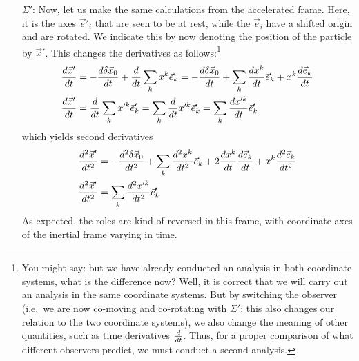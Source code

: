 \documentclass[../class_mech_main.tex]{subfiles}
\begin{document}
\begin{itemize}
	\item[$\Sigma'$:] Now, let us make the same calculations from the accelerated frame. Here, it is the axes $\vec{e}'_i$ that are seen to be at rest, while the $\vec{e}_i$ have a shifted origin and are rotated. We indicate this by now denoting the position of the particle by $\vec{x}'$. This changes the derivatives as follows:\footnote{You might say: but we have already conducted an analysis in both coordinate systems, what is the difference now? Well, it is correct that we will carry out an analysis in the same coordinate systems. But by switching the observer (i.e.~we are now co-moving and co-rotating with $\Sigma'$; this also changes our relation to the two coordinate systems), we also change the meaning of other quantities, such as time derivatives $\dv{t}$. Thus, for a proper comparison of what different observers predict, we must conduct a second analysis.}
	\begin{align}
		\dv{\vec{x}'}{t} &= -\dv{\delta \vec{x}_0}{t} + \dv{t} \sum_k x^k\vec{e}_k = -\dv{\delta \vec{x}_0}{t} + \sum_k \dv{x^k}{t} \vec{e}_k + x^k \dv{\vec{e}_k}{t}
		\label{eq:velocity_from_accel_frame_in_inert_frame}
		\\
		\dv{\vec{x}'}{t} &= \dv{t} \sum_k x'^k \vec{e}'_k = \sum_k \dv{t} x'^k \vec{e}'_k = \sum_k \dv{x'^k}{t} \vec{e}'_k
		\label{eq:velocity_from_accel_frame_in_accel_frame}
	\end{align}
	which yields second derivatives
	\begin{align}
		\dv[2]{\vec{x}'}{t} &= -\dv[2]{\delta \vec{x}_0}{t} + \sum_k \dv[2]{x^k}{t} \vec{e}_k + 2 \dv{x^k}{t} \dv{\vec{e}_k}{t} + x^k \dv[2]{\vec{e}_k}{t}
		\label{eq:acceleration_from_accel_frame_in_inert_frame}
		\\
		\dv[2]{\vec{x}'}{t} &= \sum_k \dv[2]{x'^k}{t} \vec{e}'_k
		\label{eq:acceleration_from_accel_frame_in_accel_frame}
	\end{align}
	As expected, the roles are kind of reversed in this frame, with coordinate axes of the inertial frame varying in time.



\end{itemize}
\end{document}
